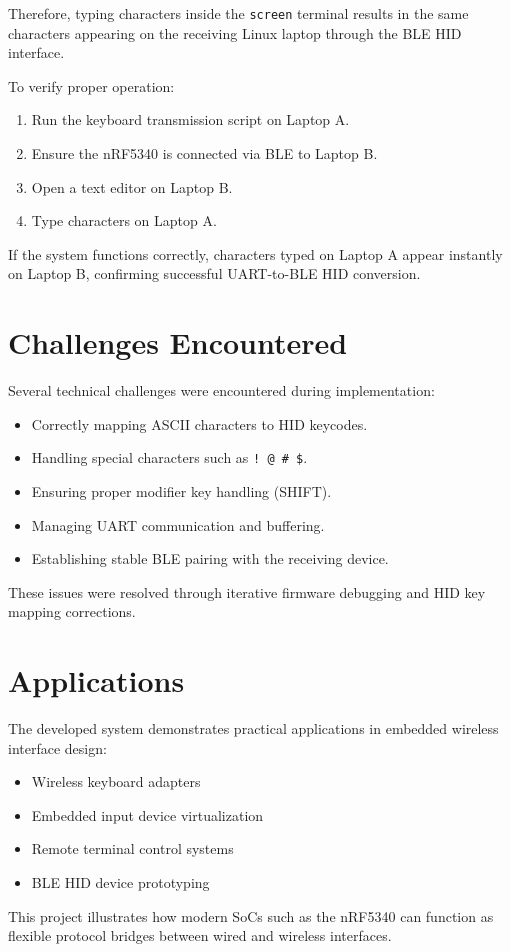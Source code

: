 \documentclass[conference]{IEEEtran}
\begin{document}
Therefore, typing characters inside the \texttt{screen} terminal results in the same characters appearing on the receiving Linux laptop through the BLE HID interface.


To verify proper operation:

\begin{enumerate}
\item Run the keyboard transmission script on Laptop A.
\item Ensure the nRF5340 is connected via BLE to Laptop B.
\item Open a text editor on Laptop B.
\item Type characters on Laptop A.
\end{enumerate}

If the system functions correctly, characters typed on Laptop A appear instantly on Laptop B, confirming successful UART-to-BLE HID conversion.

\section{Challenges Encountered}

Several technical challenges were encountered during implementation:

\begin{itemize}
\item Correctly mapping ASCII characters to HID keycodes.
\item Handling special characters such as \texttt{! @ \# \$}.
\item Ensuring proper modifier key handling (SHIFT).
\item Managing UART communication and buffering.
\item Establishing stable BLE pairing with the receiving device.
\end{itemize}

These issues were resolved through iterative firmware debugging and HID key mapping corrections.

\section{Applications}

The developed system demonstrates practical applications in embedded wireless interface design:

\begin{itemize}
\item Wireless keyboard adapters
\item Embedded input device virtualization
\item Remote terminal control systems
\item BLE HID device prototyping
\end{itemize}

This project illustrates how modern SoCs such as the nRF5340 can function as flexible protocol bridges between wired and wireless interfaces.
\end{document}
